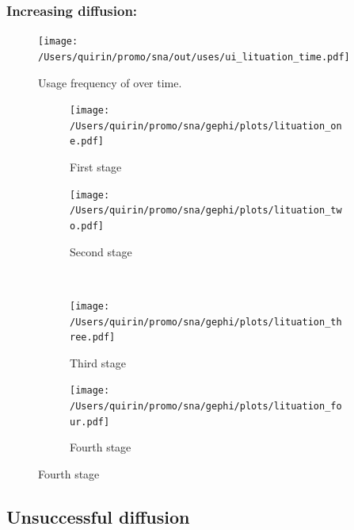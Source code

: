 \documentclass[
  a4paper,
  ]{scrartcl}
\begin{document}
    \subsubsection{Increasing diffusion: }

      \begin{figure}[H]
        \caption{Usage frequency of  over time.}
        \centering
        \texttt{[image: /Users/quirin/promo/sna/out/uses/ui\_lituation\_time.pdf]}
      \end{figure}

      \begin{figure}[H]
        \caption{Social network of diffusion for  over time.}
        \centering
        \begin{subfigure}{.45\linewidth}
          \caption{First stage}
          \centering
          \texttt{[image: /Users/quirin/promo/sna/gephi/plots/lituation\_one.pdf]}
        \end{subfigure}
        \begin{subfigure}{.45\linewidth}
          \caption{Second stage}
          \centering
          \texttt{[image: /Users/quirin/promo/sna/gephi/plots/lituation\_two.pdf]}
        \end{subfigure}\\
        \begin{subfigure}{.45\linewidth}
          \caption{Third stage}
          \centering
          \texttt{[image: /Users/quirin/promo/sna/gephi/plots/lituation\_three.pdf]}
        \end{subfigure}
        \begin{subfigure}{.45\linewidth}
          \caption{Fourth stage}
          \centering
          \texttt{[image: /Users/quirin/promo/sna/gephi/plots/lituation\_four.pdf]}
        \end{subfigure}
      \end{figure}

  \subsection{Unsuccessful diffusion}

    \subsubsection{}
\end{document}
